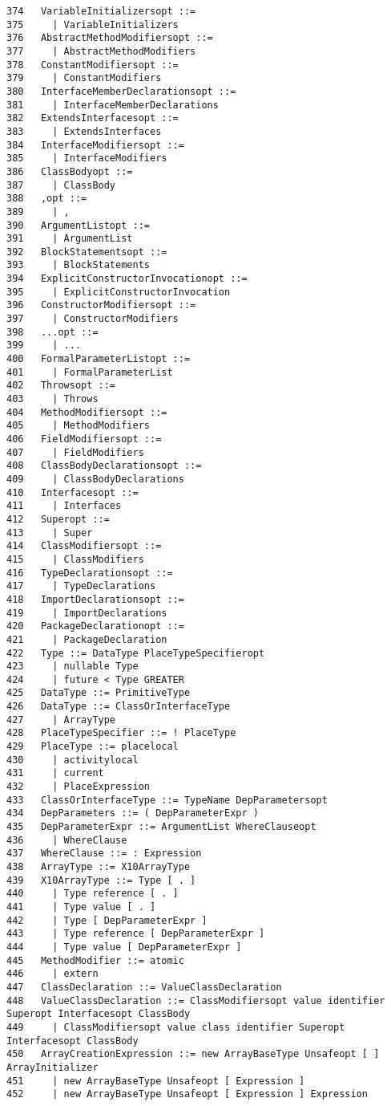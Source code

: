 {\begin{verbatim}
374   VariableInitializersopt ::=
375     | VariableInitializers
376   AbstractMethodModifiersopt ::=
377     | AbstractMethodModifiers
378   ConstantModifiersopt ::=
379     | ConstantModifiers
380   InterfaceMemberDeclarationsopt ::=
381     | InterfaceMemberDeclarations
382   ExtendsInterfacesopt ::=
383     | ExtendsInterfaces
384   InterfaceModifiersopt ::=
385     | InterfaceModifiers
386   ClassBodyopt ::=
387     | ClassBody
388   ,opt ::=
389     | ,
390   ArgumentListopt ::=
391     | ArgumentList
392   BlockStatementsopt ::=
393     | BlockStatements
394   ExplicitConstructorInvocationopt ::=
395     | ExplicitConstructorInvocation
396   ConstructorModifiersopt ::=
397     | ConstructorModifiers
398   ...opt ::=
399     | ...
400   FormalParameterListopt ::=
401     | FormalParameterList
402   Throwsopt ::=
403     | Throws
404   MethodModifiersopt ::=
405     | MethodModifiers
406   FieldModifiersopt ::=
407     | FieldModifiers
408   ClassBodyDeclarationsopt ::=
409     | ClassBodyDeclarations
410   Interfacesopt ::=
411     | Interfaces
412   Superopt ::=
413     | Super
414   ClassModifiersopt ::=
415     | ClassModifiers
416   TypeDeclarationsopt ::=
417     | TypeDeclarations
418   ImportDeclarationsopt ::=
419     | ImportDeclarations
420   PackageDeclarationopt ::=
421     | PackageDeclaration
422   Type ::= DataType PlaceTypeSpecifieropt
423     | nullable Type
424     | future < Type GREATER
425   DataType ::= PrimitiveType
426   DataType ::= ClassOrInterfaceType
427     | ArrayType
428   PlaceTypeSpecifier ::= ! PlaceType
429   PlaceType ::= placelocal
430     | activitylocal
431     | current
432     | PlaceExpression
433   ClassOrInterfaceType ::= TypeName DepParametersopt
434   DepParameters ::= ( DepParameterExpr )
435   DepParameterExpr ::= ArgumentList WhereClauseopt
436     | WhereClause
437   WhereClause ::= : Expression
438   ArrayType ::= X10ArrayType
439   X10ArrayType ::= Type [ . ]
440     | Type reference [ . ]
441     | Type value [ . ]
442     | Type [ DepParameterExpr ]
443     | Type reference [ DepParameterExpr ]
444     | Type value [ DepParameterExpr ]
445   MethodModifier ::= atomic
446     | extern
447   ClassDeclaration ::= ValueClassDeclaration
448   ValueClassDeclaration ::= ClassModifiersopt value identifier Superopt Interfacesopt ClassBody
449     | ClassModifiersopt value class identifier Superopt Interfacesopt ClassBody
450   ArrayCreationExpression ::= new ArrayBaseType Unsafeopt [ ] ArrayInitializer
451     | new ArrayBaseType Unsafeopt [ Expression ]
452     | new ArrayBaseType Unsafeopt [ Expression ] Expression

\end{verbatim}}
